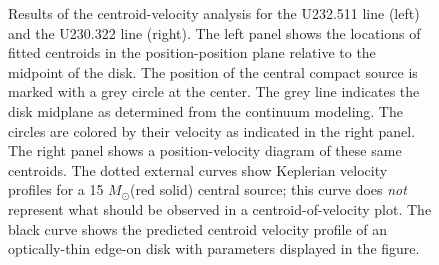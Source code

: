 \documentclass[twocolumn]{aastex61}
\newcommand{\msun}{\ensuremath{M_{\odot}}\xspace}			%
\begin{document}
\begin{figure}[!htp]
\caption{Results of the centroid-velocity analysis for the U232.511 line (left) and the U230.322 line (right).
The left panel shows the locations of fitted centroids in the position-position
plane relative to the midpoint of the disk.  
The position of the central compact source is
marked with a grey circle at the center.  The grey line indicates the disk
midplane as determined from the continuum modeling.  The circles are colored by
their velocity as indicated in
the right panel.  The right panel shows a position-velocity diagram of these
same centroids.  The dotted external curves show Keplerian velocity profiles
for a  15 \msun (red solid) central source; this curve does \emph{not} represent
what should be observed in a centroid-of-velocity plot.
The black curve shows the predicted centroid velocity profile of an
optically-thin edge-on disk with parameters displayed in the figure.
}
\label{fig:velcen_U4}
\end{figure}
\end{document}
